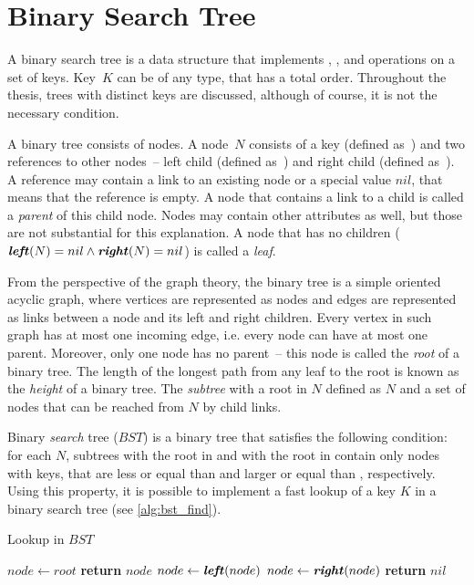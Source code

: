 \section{Binary Search Tree}

A binary search tree is a data structure that implements \findop, \insertop, and \removeop operations on a set of keys. Key~$K$ can be of any type, that has a total order. Throughout the thesis, trees with distinct keys are discussed, although of course, it is not the necessary condition.

A binary tree consists of nodes. A node~$N$ consists of a key (defined as~) and two references to other nodes~-- left child (defined as~) and right child (defined as~). A reference may contain a link to an existing node or a special value $nil$, that means that the reference is empty. A node that contains a link to a child is called a \emph{parent} of this child node. Nodes may contain other attributes as well, but those are not substantial for this explanation. A node that has no children (\(\textbf{\textit{left}}(N) = nil \land \textbf{\textit{right}}(N) = nil\)) is called a \emph{leaf}.

From the perspective of the graph theory, the binary tree is a simple oriented acyclic graph, where vertices are represented as nodes and edges are represented as links between a node and its left and right children. Every vertex in such graph has at most one incoming edge, i.e. every node can have at most one parent. Moreover, only one node has no parent~-- this node is called the \emph{root} of a binary tree. The length of the longest path from any leaf to the root is known as the \emph{height} of a binary tree. The \emph{subtree} with a root in $N$ defined as $N$ and a set of nodes that can be reached from $N$ by child links.

Binary \emph{search} tree ($BST$) is a binary tree that satisfies the following condition: for each $N$, subtrees with the root in  and with the root in  contain only nodes with keys, that are less or equal than  and larger or equal than , respectively. Using this property, it is possible to implement a fast lookup of a key $K$ in a binary search tree (see \cref{alg:bst_find}).

\begin{algorithm}
\caption{Lookup in $BST$}\label{alg:bst_find}
\begin{algorithmic}[1]
    \State $node\gets root$
      \State \textbf{return} $node$
      \State $node \gets \textbf{\textit{left}}(node)$
    \Else {}
      \State $node \gets \textbf{\textit{right}}(node)$
    \EndIf
    \EndWhile
    \State \textbf{return} $nil$
  \EndProcedure
\end{algorithmic}
\end{algorithm}

